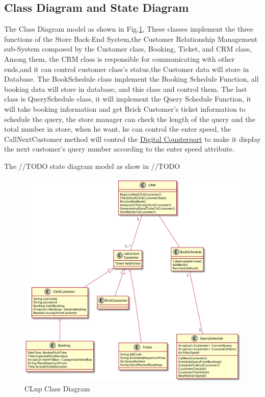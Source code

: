\documentclass[a4paper,12pt]{book}
\begin{document}
\subsection{Class Diagram and State Diagram}
The Class Diagram model as shown in Fig.\ref{Class Diagram}, These classes implement the three functions of the Store Back-End System,the Customer Relationship Management sub-System composed by the  Customer class, Booking, Ticket, and CRM class, Among them, the CRM class is responsible for communicating with other ends,and it can control customer class's status,the Customer data will store in Database. The BookSchedule class implement the Booking Schedule Function, all booking data will store in database, and this class and control them. The last class is QuerySchedule class, it will implement the Query Schedule Function, it will take booking information and get Brick Customer's ticket information to schedule the query, the store manager can check the length of the query and the total number in store, when he want, he can control the enter speed, the CallNextCustomer method will control the \hyperref[Definitions]{Digital Counterpart} to make it display the next customer's query number according to the enter speed attribute.

The //TODO state diagram model as show in //TODO


\begin{figure} \label{Class Diagram}
	\includegraphics[scale=0.3]{class_diagram.png}
	\caption{CLup Class Diagram}
	\centering
\end{figure}
\end{document}
